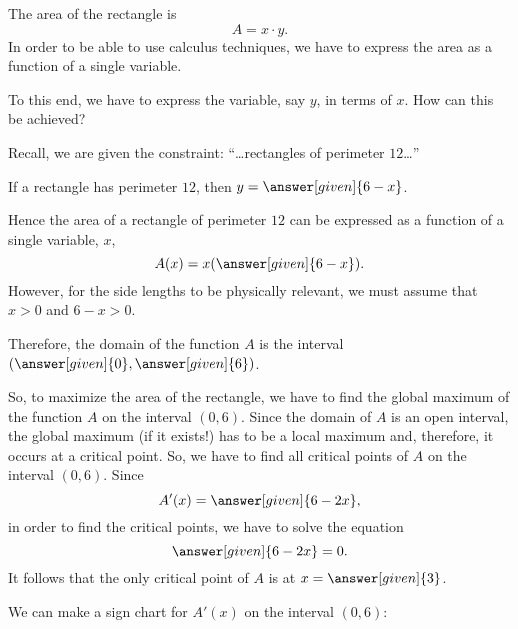 \documentclass{ximera}
\begin{document}
\begin{example}
\begin{explanation}
  The area of the rectangle  is 
  \[
    A = x\cdot y.
    \]
   In order to be able to use  calculus techniques,  we have to express the area as a function of a single variable.
   
   To this end, we have to  express the variable, say $y$, in terms of $x$. How can this be achieved?
    
  Recall, we are given the constraint: ``\dots rectangles of perimeter $12$\dots''
  
    If a rectangle has perimeter $12$, then
     $y=\answer[given]{6-x}$.
     
    Hence the area of a rectangle of perimeter $12$ can be expressed as a function of a single variable, $x$,
    \[
    A(x) = x(\answer[given]{6-x}).
    \]
    However, for the side lengths to be physically relevant, we must
    assume that $x>0$ and $6-x>0$.
    
     Therefore, the domain of  the function $A$ is  the interval
    $(\answer[given]{0},\answer[given]{6})$. 
      
    So, to maximize the area of the rectangle, we have to find the global maximum of the function $A$ on the interval $(0,6)$.
   Since the domain of $A$ is an open interval, the global maximum (if it exists!) has to be a local maximum and, therefore, it occurs at a critical point.
   So, we have to find all critical points of $A$ on the interval $(0,6)$.
    Since
    \[
    A'(x) = \answer[given]{6-2x},
    \]
   in order to find the critical points, we have to solve the equation
    \[
    \answer[given]{6-2x} = 0.
    \]
   It follows that the only critical point of $A$ is at $x=\answer[given]{3}$.
   
    We can make a sign chart for $A'(x)$ on the interval $(0,6)$:
    \begin{image}
\end{image}
\end{explanation}
\end{example}
\end{document}
